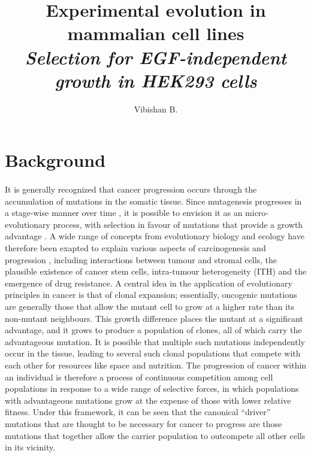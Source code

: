 \documentclass[12pt, letterpaper, onecolumn]{article}
\title{Experimental evolution in mammalian cell lines \\
	\large \textit{Selection for EGF-independent growth in HEK293 cells}}
\author{Vibishan B.}
\begin{document}
	\maketitle
	\section{Background}
	\paragraph{\empty}It is generally recognized that cancer progression occurs through the accumulation of mutations in the somatic tissue. Since mutagenesis progresses in a stage-wise manner over time \cite{ARMITAGE1954}, it is possible to envision it as an micro-evolutionary process, with selection in favour of mutations that provide a growth advantage \cite{Nowell1976a}. A wide range of concepts from evolutionary biology and ecology have therefore been exapted to explain various aspects of carcinogenesis and progression \cite{Aktipis2013,Gerlinger2014,Kareva2011,Merlo2006,Davis2017a}, including interactions between tumour and stromal cells, the plausible existence of cancer stem cells, intra-tumour heterogeneity (ITH) and the emergence of drug resistance. A central idea in the application of evolutionary principles in cancer is that of clonal expansion; essentially, oncogenic mutations are generally those that allow the mutant cell to grow at a higher rate than its non-mutant neighbours. This growth difference places the mutant at a significant advantage, and it grows to produce a population of clones, all of which carry the advantageous mutation. It is possible that multiple such mutations independently occur in the tissue, leading to several such clonal populations that compete with each other for resources like space and nutrition. The progression of cancer within an individual is therefore a process of continuous competition among cell populations in response to a wide range of selective forces, in which populations with advantageous mutations grow at the expense of those with lower relative fitness. Under this framework, it can be seen that the canonical ``driver'' mutations that are thought to be necessary for cancer to progress are those mutations that together allow the carrier population to outcompete all other cells in its vicinity. 
	
\end{document}
